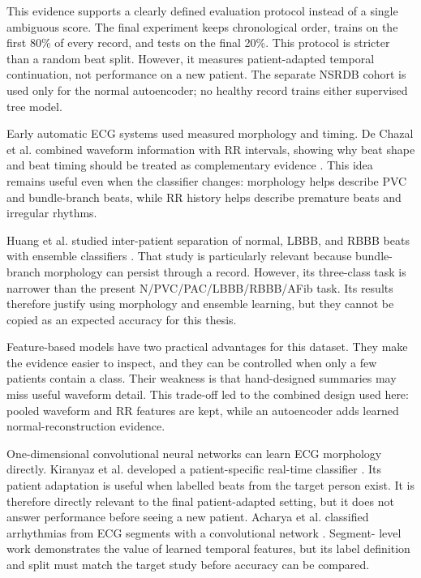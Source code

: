 This evidence supports a clearly defined evaluation protocol instead of a
single ambiguous score. The final experiment keeps chronological order, trains
on the first 80\% of every record, and tests on the final 20\%. This protocol
is stricter than a random beat split. However, it measures patient-adapted
temporal continuation, not performance on a new patient. The separate NSRDB
cohort is used only for the normal autoencoder; no healthy record trains either
supervised tree model.

Early automatic ECG systems used measured morphology and timing. De Chazal et
al. combined waveform information with RR intervals, showing why beat shape and
beat timing should be treated as complementary evidence
\cite{dechazal2004heartbeat}. This idea remains useful even when the classifier
changes: morphology helps describe PVC and bundle-branch beats, while RR history
helps describe premature beats and irregular rhythms.

Huang et al. studied inter-patient separation of normal, LBBB, and RBBB beats
with ensemble classifiers \cite{huang2014bbb}. That study is particularly
relevant because bundle-branch morphology can persist through a record. However,
its three-class task is narrower than the present N/PVC/PAC/LBBB/RBBB/AFib task.
Its results therefore justify using morphology and ensemble learning, but they
cannot be copied as an expected accuracy for this thesis.

Feature-based models have two practical advantages for this dataset. They make
the evidence easier to inspect, and they can be controlled when only a few
patients contain a class. Their weakness is that hand-designed summaries may
miss useful waveform detail. This trade-off led to the combined design used
here: pooled waveform and RR features are kept, while an autoencoder adds
learned normal-reconstruction evidence.

One-dimensional convolutional neural networks can learn ECG morphology directly.
Kiranyaz et al. developed a patient-specific real-time classifier
\cite{kiranyaz2016ecgcnn}. Its patient adaptation is useful when labelled beats
from the target person exist. It is therefore directly relevant to the
final patient-adapted setting, but it does not answer performance before
seeing a new patient. Acharya et al. classified arrhythmias
from ECG segments with a convolutional network \cite{acharya2017cnn}. Segment-
level work demonstrates the value of learned temporal features, but its label
definition and split must match the target study before accuracy can be compared.

